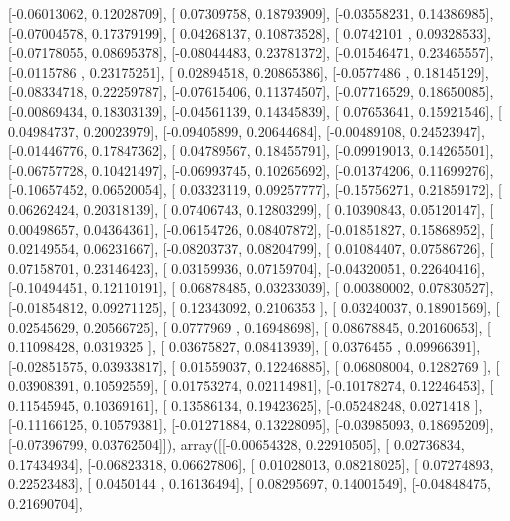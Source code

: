 \documentclass{article}
\begin{document}
       [-0.06013062,  0.12028709],
       [ 0.07309758,  0.18793909],
       [-0.03558231,  0.14386985],
       [-0.07004578,  0.17379199],
       [ 0.04268137,  0.10873528],
       [ 0.0742101 ,  0.09328533],
       [-0.07178055,  0.08695378],
       [-0.08044483,  0.23781372],
       [-0.01546471,  0.23465557],
       [-0.0115786 ,  0.23175251],
       [ 0.02894518,  0.20865386],
       [-0.0577486 ,  0.18145129],
       [-0.08334718,  0.22259787],
       [-0.07615406,  0.11374507],
       [-0.07716529,  0.18650085],
       [-0.00869434,  0.18303139],
       [-0.04561139,  0.14345839],
       [ 0.07653641,  0.15921546],
       [ 0.04984737,  0.20023979],
       [-0.09405899,  0.20644684],
       [-0.00489108,  0.24523947],
       [-0.01446776,  0.17847362],
       [ 0.04789567,  0.18455791],
       [-0.09919013,  0.14265501],
       [-0.06757728,  0.10421497],
       [-0.06993745,  0.10265692],
       [-0.01374206,  0.11699276],
       [-0.10657452,  0.06520054],
       [ 0.03323119,  0.09257777],
       [-0.15756271,  0.21859172],
       [ 0.06262424,  0.20318139],
       [ 0.07406743,  0.12803299],
       [ 0.10390843,  0.05120147],
       [ 0.00498657,  0.04364361],
       [-0.06154726,  0.08407872],
       [-0.01851827,  0.15868952],
       [ 0.02149554,  0.06231667],
       [-0.08203737,  0.08204799],
       [ 0.01084407,  0.07586726],
       [ 0.07158701,  0.23146423],
       [ 0.03159936,  0.07159704],
       [-0.04320051,  0.22640416],
       [-0.10494451,  0.12110191],
       [ 0.06878485,  0.03233039],
       [ 0.00380002,  0.07830527],
       [-0.01854812,  0.09271125],
       [ 0.12343092,  0.2106353 ],
       [ 0.03240037,  0.18901569],
       [ 0.02545629,  0.20566725],
       [ 0.0777969 ,  0.16948698],
       [ 0.08678845,  0.20160653],
       [ 0.11098428,  0.0319325 ],
       [ 0.03675827,  0.08413939],
       [ 0.0376455 ,  0.09966391],
       [-0.02851575,  0.03933817],
       [ 0.01559037,  0.12246885],
       [ 0.06808004,  0.1282769 ],
       [ 0.03908391,  0.10592559],
       [ 0.01753274,  0.02114981],
       [-0.10178274,  0.12246453],
       [ 0.11545945,  0.10369161],
       [ 0.13586134,  0.19423625],
       [-0.05248248,  0.0271418 ],
       [-0.11166125,  0.10579381],
       [-0.01271884,  0.13228095],
       [-0.03985093,  0.18695209],
       [-0.07396799,  0.03762504]]), array([[-0.00654328,  0.22910505],
       [ 0.02736834,  0.17434934],
       [-0.06823318,  0.06627806],
       [ 0.01028013,  0.08218025],
       [ 0.07274893,  0.22523483],
       [ 0.0450144 ,  0.16136494],
       [ 0.08295697,  0.14001549],
       [-0.04848475,  0.21690704],
\end{document}
